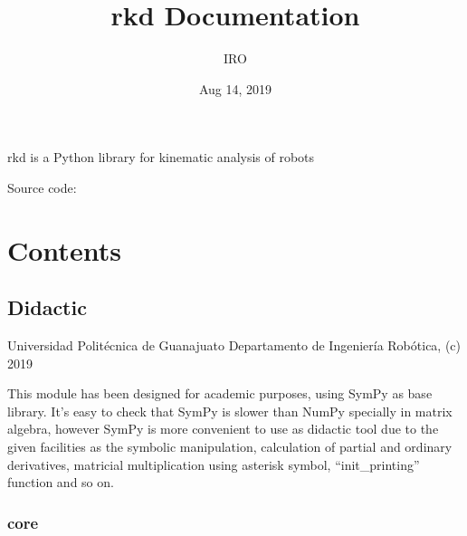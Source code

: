 \documentclass[letterpaper,10pt,english]{sphinxmanual}
\title{rkd Documentation}
\date{Aug 14, 2019}
\author{IRO}
\begin{document}
\maketitle
\sphinxtableofcontents
{}\label{\detokenize{index::doc}}


rkd is a Python library for kinematic analysis of robots

Source code: 


\chapter{Contents}
\label{\detokenize{index:welcome-to-rkd-s-documentation}}\label{\detokenize{index:contents}}

\section{Didactic}
\label{\detokenize{_src/didactic:didactic}}\label{\detokenize{_src/didactic:module-rkd.didactic}}\label{\detokenize{_src/didactic::doc}}
Universidad Politécnica de Guanajuato
Departamento de Ingeniería Robótica, (c) 2019

This module has been designed for academic purposes, using SymPy as base library. 
It’s easy to check that SymPy is slower than NumPy specially in matrix algebra, 
however SymPy is more convenient to use as didactic tool due to the given facilities 
as the symbolic manipulation, calculation of partial and ordinary derivatives, 
matricial multiplication using asterisk symbol, “init\_printing” function and so on.


\subsection{core}
\label{\detokenize{_src/didactic:core}}\label{\detokenize{_src/didactic:module-rkd.didactic.core}}
\end{document}

